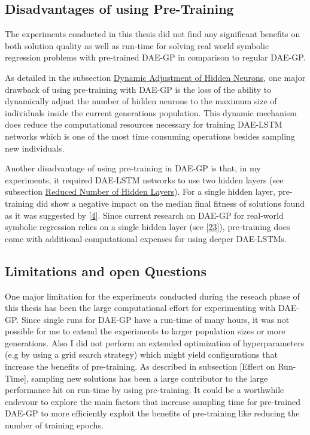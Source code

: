 \documentclass[
  11pt,
]{article}
\begin{document}
\hypertarget{disadvantages-of-using-pre-training}{%
\subsection{Disadvantages of using Pre-Training}\label{disadvantages-of-using-pre-training}}

The experiments conducted in this thesis did not find any significant benefits on both solution quality as well as run-time for solving real world symbolic regression problems with pre-trained DAE-GP in comparison to regular DAE-GP.

As detailed in the subsection \protect\hyperlink{dynamic-adjustment-of-hidden-neurons}{Dynamic Adjustment of Hidden Neurons}, one major drawback of using pre-training with DAE-GP is the loss of the ability to dynamically adjust the number of hidden neurons to the maximum size of individuals inside the current generations population. This dynamic mechanism does reduce the computational resources necessary for training DAE-LSTM networks which is one of the most time consuming operations besides sampling new individuals.

Another disadvantage of using pre-training in DAE-GP is that, in my experiments, it required DAE-LSTM networks to use two hidden layers (see subsection \protect\hyperlink{reduced-number-of-hidden-layers}{Reduced Number of Hidden Layers}). For a single hidden layer, pre-training did show a negative impact on the median final fitness of solutions found as it was suggested by {[}\protect\hyperlink{ref-pmlr-v9-erhan10a}{4}{]}. Since current research on DAE-GP for real-world symbolic regression relies on a single hidden layer (see {[}\protect\hyperlink{ref-dae-gp_2022_symreg}{23}{]}), pre-training does come with additional computational expenses for using deeper DAE-LSTMs.

\hypertarget{limitations-and-open-questions}{%
\subsection{Limitations and open Questions}\label{limitations-and-open-questions}}

One major limitation for the experiments conducted during the reseach phase of this thesis has been the large computational effort for experimenting with DAE-GP. Since single runs for DAE-GP have a run-time of many hours, it was not possible for me to extend the experiments to larger population sizes or more generations. Also I did not perform an extended optimization of hyperparameters (e.g by using a grid search strategy) which might yield configurations that increase the benefits of pre-training. As described in subsection {[}Effect on Run-Time{]}, sampling new solutions has been a large contributor to the large performance hit on run-time by using pre-training. It could be a worthwhile endevour to explore the main factors that increase sampling time for pre-trained DAE-GP to more efficiently exploit the benefits of pre-training like reducing the number of training epochs.
\end{document}
